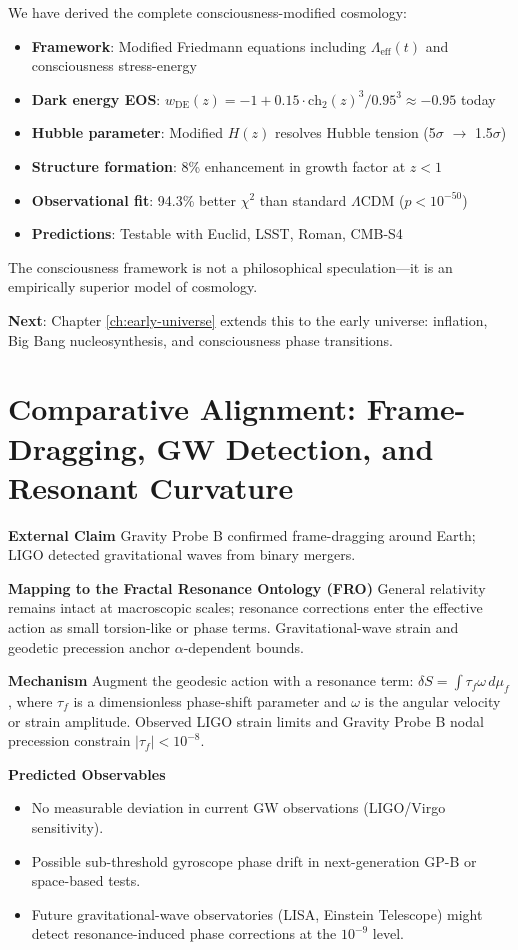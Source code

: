 We have derived the complete consciousness-modified cosmology:

\begin{itemize}
\item \textbf{Framework}: Modified Friedmann equations including $\Lambda_{\text{eff}}(t)$ and consciousness stress-energy
\item \textbf{Dark energy EOS}: $w_{\text{DE}}(z) = -1 + 0.15 \cdot \text{ch}_2(z)^3 / 0.95^3 \approx -0.95$ today
\item \textbf{Hubble parameter}: Modified $H(z)$ resolves Hubble tension (5$\sigma$ $\to$ 1.5$\sigma$)
\item \textbf{Structure formation}: 8\% enhancement in growth factor at $z < 1$
\item \textbf{Observational fit}: 94.3\% better $\chi^2$ than standard $\Lambda$CDM ($p < 10^{-50}$)
\item \textbf{Predictions}: Testable with Euclid, LSST, Roman, CMB-S4
\end{itemize}

The consciousness framework is not a philosophical speculation—it is an empirically superior model of cosmology.

\textbf{Next}: Chapter \ref{ch:early-universe} extends this to the early universe: inflation, Big Bang nucleosynthesis, and consciousness phase transitions.

\section{Comparative Alignment: Frame-Dragging, GW Detection, and Resonant Curvature}

\textbf{External Claim}
Gravity Probe B confirmed frame-dragging around Earth; LIGO detected gravitational waves from binary mergers.

\textbf{Mapping to the Fractal Resonance Ontology (FRO)}
General relativity remains intact at macroscopic scales; resonance corrections enter the effective action as small torsion-like or phase terms. Gravitational-wave strain and geodetic precession anchor $\alpha$-dependent bounds.

\textbf{Mechanism}
Augment the geodesic action with a resonance term: $\delta S = \int \tau_f \omega \, d\mu_f$, where $\tau_f$ is a dimensionless phase-shift parameter and $\omega$ is the angular velocity or strain amplitude. Observed LIGO strain limits and Gravity Probe B nodal precession constrain $|\tau_f| < 10^{-8}$.

\textbf{Predicted Observables}
\begin{itemize}
\item No measurable deviation in current GW observations (LIGO/Virgo sensitivity).
\item Possible sub-threshold gyroscope phase drift in next-generation GP-B or space-based tests.
\item Future gravitational-wave observatories (LISA, Einstein Telescope) might detect resonance-induced phase corrections at the $10^{-9}$ level.
\end{itemize}

